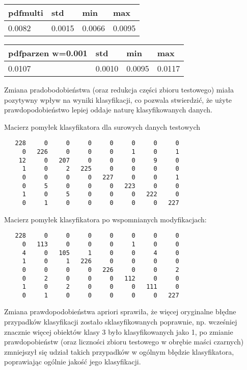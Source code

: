 \documentclass[11pt]{article}
\begin{document}
\begin{longtable}[]{@{}llll@{}}
\toprule
pdfmulti & std & min & max\tabularnewline
\midrule
\endhead
0.0082 & 0.0015 & 0.0066 & 0.0095\tabularnewline
\bottomrule
\end{longtable}

\begin{longtable}[]{@{}llll@{}}
\toprule
pdfparzen w=0.001 & std & min & max\tabularnewline
\midrule
\endhead
0.0107 & 0.0010 & 0.0095 & 0.0117\tabularnewline
\bottomrule
\end{longtable}

Zmiana pradobodobieństwa (oraz redukcja części zbioru testowego) miała
pozytywny wpływ na wyniki klasyfikacji, co pozwala stwierdzić, że użyte
prawdopodobieństwo lepiej oddaje naturę klasyfikowanych danych.

Macierz pomyłek klasyfikatora dla surowych danych testowych

\begin{verbatim}
   228     0     0     0     0     0     0     0
     0   226     0     0     0     1     0     1
    12     0   207     0     0     0     9     0
     1     0     2   225     0     0     0     0
     0     0     0     0   227     0     0     1
     0     5     0     0     0   223     0     0
     1     0     5     0     0     0   222     0
     0     1     0     0     0     0     0   227
\end{verbatim}

Macierz pomyłek klasyfikatora po wspomnianych modyfikacjach:

\begin{verbatim}
   228     0     0     0     0     0     0     0
     0   113     0     0     0     1     0     0
     4     0   105     1     0     0     4     0
     1     0     1   226     0     0     0     0
     0     0     0     0   226     0     0     2
     0     2     0     0     0   112     0     0
     1     0     2     0     0     0   111     0
     0     1     0     0     0     0     0   227
\end{verbatim}

Zmiana prawdopodobieństwa apriori sprawiła, że więcej oryginalne błędne
przypadków klasyfikacji zostało sklasyfikowanych poprawnie, np.
wcześniej znacznie więcej obiektów klasy 3 było klasyfikowanych jako 1,
po zmianie prawdopobieństw (oraz liczności zbioru testowego w obrębie
maści czarnych) zmniejszył się udział takich przypadków w ogólnym
błędzie klasyfikatora, poprawiając ogólnie jakość jego klasyfikacji.
\end{document}
